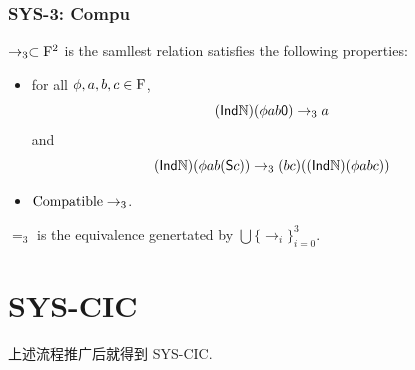 \subsubsection*{SYS-3: Compu}

 \begin{definition}
  $\rightarrow_{3} \subset \mathrm{F}^2$ is the samllest relation satisfies the following properties:
  \begin{itemize}
    \item for all $ \phi, a, b, c \in \mathrm{F}$,
      \[
         (\text{{\sffamily Ind}}\mathbb{N})(\phi a b \text{{\sffamily 0}}) \rightarrow_3 a
      \]
      and
      \[
        (\text{{\sffamily Ind}}\mathbb{N})(\phi a b (\text{{\sffamily S}} c)) \rightarrow_3 (b c)((\text{{\sffamily Ind}}\mathbb{N})(\phi a b c)) 
      \]
    \item $\mathrm{Compatible}\rightarrow_3$.
  \end{itemize}
  $=_3$ is the equivalence genertated by $\bigcup \{\rightarrow_i\}_{i=0}^3$.
\end{definition}







\section{SYS-CIC}

上述流程推广后就得到 SYS-CIC. 


